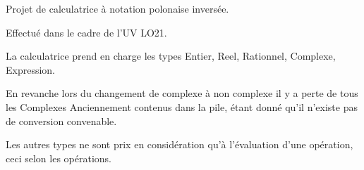 \begin{DoxyParagraph}{Projet de calculatrice à notation polonaise inversée.}

\end{DoxyParagraph}
\begin{DoxyParagraph}{Effectué dans le cadre de l'U\-V L\-O21.}

\end{DoxyParagraph}
\begin{DoxyParagraph}{La calculatrice prend en charge les types Entier, Reel, Rationnel, Complexe, Expression.}

\end{DoxyParagraph}
\begin{DoxyParagraph}{}
En revanche lors du changement de complexe à non complexe il y a perte de tous les Complexes Anciennement contenus dans la pile, étant donné qu'il n'existe pas de conversion convenable. 
\end{DoxyParagraph}
\begin{DoxyParagraph}{}
Les autres types ne sont prix en considération qu'à l'évaluation d'une opération, ceci selon les opérations. 
\end{DoxyParagraph}
